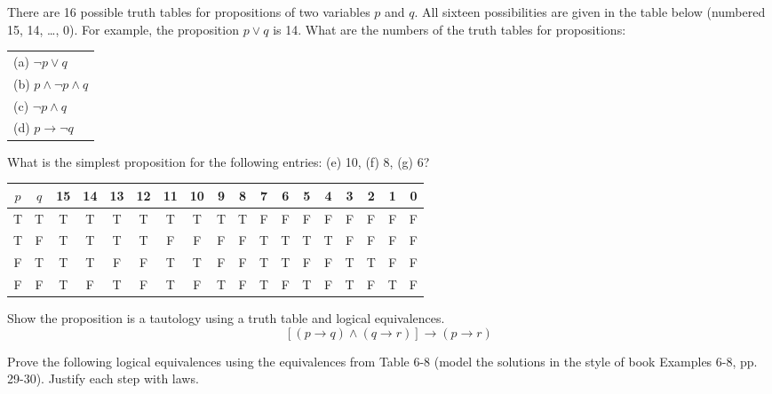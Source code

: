 \documentclass[12pt,addpoints]{exam}
\begin{document}
\begin{questions}
\question There are 16 possible truth tables for propositions of two variables $p$ and $q$.  All sixteen possibilities are given in the table below (numbered 15, 14, \ldots, 0).  For example, the proposition $p \vee q$ is 14. What are the numbers of the truth tables for propositions:\\
 \begin{tabular}{l}
    (a) $\neg p \vee q$ \\
    (b) $p \wedge \neg p \wedge q$ \\
    (c) $\neg p \wedge q $ \\
    (d) $p \rightarrow \neg q$ \\
 \end{tabular}

 What is the simplest proposition for the following entries: (e) 10, (f) 8, (g) 6? \\
 \begin{tabular}{cc|cccc|cccc|cccc|cccc}
    $p$ & $q$ & 15 & 14 & 13 & 12 & 11 & 10 & 9 & 8 & 7 & 6 & 5 & 4 & 3 & 2 & 1 & 0 \\
    \hline
    T & T & T & T & T & T & T & T & T & T & F & F & F & F & F & F & F & F \\
    T & F & T & T & T & T & F & F & F & F & T & T & T & T & F & F & F & F \\
    F & T & T & T & F & F & T & T & F & F & T & T & F & F & T & T & F & F \\
    F & F & T & F & T & F & T & F & T & F & T & F & T & F & T & F & T & F \\
 \end{tabular}


\question Show the proposition is a tautology using a truth table
and logical equivalences.
 $$[(p \rightarrow q) \wedge (q \rightarrow r)] \rightarrow (p \rightarrow r)$$


\question Prove the following logical equivalences using the
equivalences from Table 6-8 (model the solutions in the style of
book Examples 6-8, pp. 29-30).  Justify each step with laws.


\end{questions}
\end{document}
